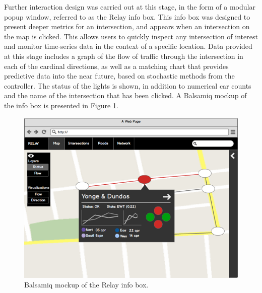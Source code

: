 \documentclass{report}
\begin{document}
Further interaction design was carried out at this stage, in the form of a modular popup window, referred to as the Relay info box.
This info box was designed to present deeper metrics for an intersection, and appears when an intersection on the map is clicked.
This allows users to quickly inspect any intersection of interest and monitor time-series data in the context of a specific location.
Data provided at this stage includes a graph of the flow of traffic through the intersection in each of the cardinal directions, as well as a matching chart that provides predictive data into the near future, based on stochastic methods from the controller.
The status of the lights is shown, in addition to numerical car counts and the name of the intersection that has been clicked.
A Balsamiq mockup of the info box is presented in Figure \ref{fig:bals-2}. \\

\begin{figure}[htbp!]
  \begin{centering}
    \includegraphics[scale=0.6]{figures/bals-2.png}
    \caption{Balsamiq mockup of the Relay info box.}
    \label{fig:bals-2}
  \end{centering}
\end{figure}
\end{document}
